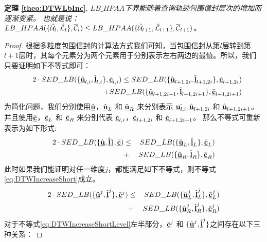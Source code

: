 \textbf{定理 \ref{theo:DTWLbInc}. }{\em 	$LB\_HPAA$下界能随着查询轨迹包围信封层次的增加而逐渐变紧。
	也就是说： $LB\_HPAA({  \{\hat{{\cal U}_{l}}, \hat{{\cal L}_{l}}\},\overline{{\cal C}}_{l}})\le  LB\_HPAA({  \{\hat{{\cal U}}_{l+1}, \hat{\cal L}_{l+1}\},\overline{\cal C}_{l+1}})$。}
\begin{proof}
	根据多粒度包围信封的计算法方式我们可知，当包围信封从第$l$层转到第$l+1$层时，其每个元素分为两个元素用于分别表示左右两边的最值。所以，我们只要证明如下不等式即可：
	\begin{eqnarray}\label{eq:increa}
	&&	2\cdot SED\_LB(\{ \hat{\emph{{\textbf{u}}}}_{l,i}, \hat{\emph{{\textbf{l}}}}_{l,i} \}, \bar{\emph{{\textbf{c}}}}_{l,i}) \le SED\_LB(\{ \hat{\emph{{\textbf{u}}}}_{l+1,2i}, \hat{\emph{{\textbf{l}}}}_{l+1,2i} \}, \bar{\emph{{\textbf{c}}}}_{l+1,2i}) \nonumber \\
	&&\qquad \qquad \qquad \qquad+ SED\_LB(\{ \hat{\emph{{\textbf{u}}}}_{l+1,2i+1}, \hat{\emph{{\textbf{l}}}}_{l+1,2i+1} \}, \bar{\emph{{\textbf{c}}}}_{l+1,2i+1})\nonumber
	\end{eqnarray}
	为简化问题，我们分别使用$\hat{\emph{{\textbf{u}}}}$，$\hat{\emph{{\textbf{u}}}}_{L} $ 和 $\hat{\emph{{\textbf{u}}}}_{R}$ 来分别表示 $\hat{\emph{{\textbf{u}}}_{l,i}}$,$\hat{\emph{{\textbf{u}}}}_{l+1,2i}$ 和 $\hat{\emph{{\textbf{u}}}}_{l+1,2i+1}$。并且使用$\bar{\emph{{\textbf{c}}}}$，$\bar{\emph{{\textbf{c}}}}_{L}$ 和 $\bar{\emph{{\textbf{c}}}}_{R}$ 来分别代表	$\bar{\emph{{\textbf{c}}}}_{l,i}$，$\bar{\emph{{\textbf{c}}}}_{l+1,2i}$ 和 $\bar{\emph{{\textbf{c}}}}_{l+1,2i+1}$。
那么不等式可重新表示为如下形式:
	\begin{eqnarray}\label{eq:DTWIncreaseShort}
	2\cdot SED\_LB(\{ \hat{\emph{{\textbf{u}}}}, \hat{\emph{{\textbf{l}}}} \}, \bar{\emph{{\textbf{c}}}}) &\le& SED\_LB(\{ \hat{\emph{{\textbf{u}}}}_{L}, \hat{\emph{{\textbf{l}}}}_{L} \}, \bar{\emph{{\textbf{c}}}}_{L})  \nonumber \\ &+& SED\_LB(\{ \hat{\emph{{\textbf{u}}}}_{R}, \hat{\emph{{\textbf{l}}}}_{R} \}, \bar{\emph{{\textbf{c}}}}_{R})
	\end{eqnarray}
	此时如果我们能证明对任一维度$j$，都能满足如下不等式，则不等式\ref{eq:DTWIncreaseShort}成立。
	\begin{eqnarray}\label{eq:DTWIncreaseShortLevel}
	2\cdot SED\_LB(\{ \hat{\emph{{\textbf{u}}}}^{j}, \hat{\emph{{\textbf{l}}}}^{j} \}, \bar{\emph{{\textbf{c}}}}^{j}) &\le& SED\_LB(\{ \hat{\emph{{\textbf{u}}}}_{L}^{j}, \hat{\emph{{\textbf{l}}}}_{L}^{j} \}, \bar{\emph{{\textbf{c}}}}_{L}^{j} )  \nonumber \\ &+& SED\_LB(\{ \hat{\emph{{\textbf{u}}}}_{R}^{j}, \hat{\emph{{\textbf{l}}}}_{R}^{j}  \}, \bar{\emph{{\textbf{c}}}}_{R}^{j})
	\end{eqnarray}
	对于不等式\ref{eq:DTWIncreaseShortLevel}左半部分，$\bar{\emph{{\textbf{c}}}}^{j}$ 和 $\{\hat{\emph{{\textbf{u}}}}^{j},\hat{\emph{{\textbf{l}}}}^{j}\}$之间存在以下三种关系：
	

\end{proof}
